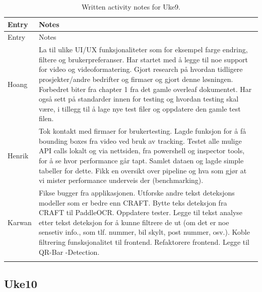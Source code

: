 \begin{longtable}{p{}p{}}
\caption{Written activity notes for Uke9.}\\
\toprule
Entry & Notes \\
\midrule
\endfirsthead
\toprule
Entry & Notes \\
\midrule
\endhead
Hoang & La til ulike UI/UX funksjonaliteter som for eksempel farge endring, filtere og brukerpreferanser. Har startet med å legge til noe support for video og videoformatering. Gjort research på hvordan tidligere prosjekter/andre bedrifter og firmaer og gjort denne løsningen. Forbedret biter fra chapter 1 fra det gamle overleaf dokumentet. Har også sett på standarder innen for testing og hvordan testing skal være, i tillegg til å lage nye test filer og oppdatere den gamle test filen. \\
\addlinespace
Henrik & Tok kontakt med firmaer for brukertesting. Lagde funksjon for å få bounding boxes fra video ved bruk av tracking. Testet alle mulige API calls lokalt og via nettsiden, fra powershell og inspector tools, for å se hvor performance går tapt. Samlet dataen og lagde simple tabeller for dette. Fikk en oversikt over pipeline og hva som gjør at vi mister performance underveis der (benchmarking). \\
\addlinespace
Karwan & Fikse bugger fra applikasjonen. Utforske andre tekst deteksjons modeller som er bedre enn CRAFT. Bytte teks deteksjon fra CRAFT til PaddleOCR. Oppdatere tester. Legge til tekst analyse etter tekst deteksjon for å kunne filtrere de ut (om det er noe sensetiv info., som tlf. nummer, bil skylt, post nummer, osv.). Koble filtrering funsksjonalitet til frontend. Refaktorere frontend. Legge til QR-Bar -Detection. \\
\addlinespace
\bottomrule
\end{longtable}

\subsection{Uke10}

